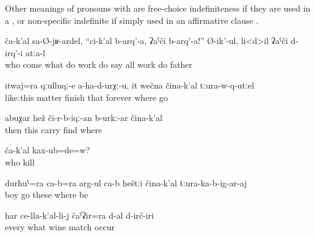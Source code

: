 Other meanings of pronouns with  are free-choice indefiniteness if they are used in a  ,  or non-specific indefinite if simply used in an affirmative clause .
%
\begin{exe}
	\ex	\label{ex:Whoever came saying, do something, do this work, father did all works}
	\gll	ča-k'al	sa-Ø-jʁ-ardel,		``ci-k'al	b-arq'-a,	ʡaˁči	b-arq'-a!''	Ø-ik'-ul,	li<d>il	ʡaˁči	d-irq'-i	atːa-l\\
		who	come		what	do		work	do	say	all	work	do	father\\
	\glt	{}

	\ex	\label{ex:And like this also (Isakadi’s) issues, things do not finish, forever, wherever he went}
	\gll	itwaj=ra	qːulluqː-e	a-ha-d-urχː-u,	it	wečna	čina-k'al	tːura-w-q-utːel\\
		like.this	matter	finish	that	forever	where	go\\
	\glt	{}

	\ex	\label{ex:Then this needs to be positioned somewhere (else) probably}
	\gll	abuχar	hež	či-r-b-iqː-an	b-urkː-ar	čina-k'al\\
		then	this	carry	find	where\\
	\glt	{}

	\ex	\label{ex:Did you kill anyone}
	\gll	ča-k'al	kax-ub=de=w?\\
		who	kill\\
	\glt	{}

	\ex	\label{ex:And together with the son they are going to sit outside anywhere}
	\gll	durħuˁ=ra	ca-b=ra	arg-ul ca-b	heštːi	čina-k'al	tːura-ka-b-ig-ar-aj\\
		boy		go 	these	where	be\\
	\glt	{}

	\ex	\label{ex:Wine fit well with any of these (types of food)}
	\gll	har	ce-lla-k'al-li-j	čaˁʡir=ra	d-al d-irč-iri\\
		every	what	wine	\tsc{npl-}match occur\\
	\glt	{}
\end{exe}

